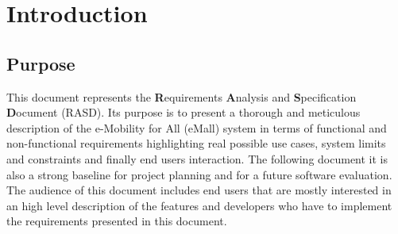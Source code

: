 \chapter{Introduction}
\section{Purpose}
This document represents the \textbf{R}equirements \textbf{A}nalysis and \textbf{S}pecification \textbf{D}ocument (RASD). Its purpose is to present a thorough and meticulous description of the e-Mobility for All (eMall) system in terms of functional and non-functional requirements highlighting real possible use cases, system limits and constraints and finally end users interaction. The following document it is also a strong baseline for project planning and for a future software evaluation.\\

The audience of this document includes end users that are mostly interested in an high level description of the features and developers who have to implement the requirements presented in this document.
